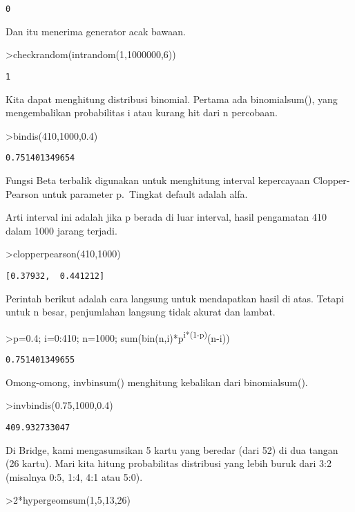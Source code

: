 \documentclass[
]{book}
\begin{document}
\begin{verbatim}
0
\end{verbatim}

Dan itu menerima generator acak bawaan.

\textgreater checkrandom(intrandom(1,1000000,6))

\begin{verbatim}
1
\end{verbatim}

Kita dapat menghitung distribusi binomial. Pertama ada binomialsum(), yang mengembalikan probabilitas i atau kurang hit dari n percobaan.

\textgreater bindis(410,1000,0.4)

\begin{verbatim}
0.751401349654
\end{verbatim}

Fungsi Beta terbalik digunakan untuk menghitung interval kepercayaan Clopper-Pearson untuk parameter p.~Tingkat default adalah alfa.

Arti interval ini adalah jika p berada di luar interval, hasil pengamatan 410 dalam 1000 jarang terjadi.

\textgreater clopperpearson(410,1000)

\begin{verbatim}
[0.37932,  0.441212]
\end{verbatim}

Perintah berikut adalah cara langsung untuk mendapatkan hasil di atas. Tetapi untuk n besar, penjumlahan langsung tidak akurat dan lambat.

\textgreater p=0.4; i=0:410; n=1000; sum(bin(n,i)*p\textsuperscript{i*(1-p)}(n-i))

\begin{verbatim}
0.751401349655
\end{verbatim}

Omong-omong, invbinsum() menghitung kebalikan dari binomialsum().

\textgreater invbindis(0.75,1000,0.4)

\begin{verbatim}
409.932733047
\end{verbatim}

Di Bridge, kami mengasumsikan 5 kartu yang beredar (dari 52) di dua tangan (26 kartu). Mari kita hitung probabilitas distribusi yang lebih buruk dari 3:2 (misalnya 0:5, 1:4, 4:1 atau 5:0).

\textgreater2*hypergeomsum(1,5,13,26)
\end{document}
